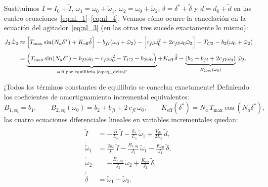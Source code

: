 \documentclass[11pt,a4paper,oneside]{book}
\begin{document}
Sustituimos $I = I_0 + \tilde I$, $\omega_1 = \omega_0 + \tilde\omega_1$,
$\omega_2 = \omega_0 + \tilde\omega_2$, $\delta = \delta^\ast + \tilde\delta$ y
$d = d_0 + \tilde d$ en las cuatro ecuaciones~\eqref{eq:nl_1}--\eqref{eq:nl_4}.
Veamos cómo ocurre la cancelación en la ecuación del agitador~\eqref{eq:nl_3}
(en las otras tres sucede exactamente lo mismo):
\begin{align*}
  J_2\,\dot{\tilde\omega}_2
  &\approx \Big[T_{\max}\sin(N_a\delta^\ast) + K_{\text{eff}}\tilde\delta\Big]
         - b_{fl}(\omega_0 + \tilde\omega_2)
         - \Big[c_{fl}\omega_0^2 + 2c_{fl}\omega_0\tilde\omega_2\Big]
         - T_{C2} - b_2(\omega_0 + \tilde\omega_2) \\[4pt]
  &= \underbrace{\Big(T_{\max}\sin(N_a\delta^\ast) - b_{fl}\omega_0 - c_{fl}\omega_0^2 - T_{C2} - b_2\omega_0\Big)}_{=\,0\text{ por equilibrio~\eqref{eq:eq_delta}!}}
   + K_{\text{eff}}\,\tilde\delta
   - \underbrace{(b_2 + b_{fl} + 2c_{fl}\omega_0)}_{B_{2,\text{eq}}(\omega_0)}\,\tilde\omega_2.
\end{align*}

¡Todos los términos constantes de equilibrio se cancelan exactamente! Definiendo
los coeficientes de amortiguamiento incremental equivalentes:
\begin{equation}
  B_{1,\text{eq}} = b_1,
  \qquad
  B_{2,\text{eq}}(\omega_0) = b_2 + b_{fl} + 2\,c_{fl}\,\omega_0,
  \qquad
  K_{\text{eff}}(\delta^\ast) = N_a\,T_{\max}\cos(N_a\delta^\ast),
  \label{eq:coefs_lin}
\end{equation}
las cuatro ecuaciones diferenciales lineales en variables incrementales quedan:
\begin{align}
  \dot{\tilde I}        &= -\frac{R}{L_s}\,\tilde I - \frac{k_e}{L_s}\,\tilde\omega_1 + \frac{V_{dc}}{2L_s}\,\tilde d, \label{eq:lin_1}\\
  \dot{\tilde\omega}_1  &= \frac{2k_e}{J_1}\,\tilde I - \frac{B_{1,\text{eq}}}{J_1}\,\tilde\omega_1 - \frac{K_{\text{eff}}}{J_1}\,\tilde\delta, \label{eq:lin_2}\\
  \dot{\tilde\omega}_2  &= -\frac{B_{2,\text{eq}}}{J_2}\,\tilde\omega_2 + \frac{K_{\text{eff}}}{J_2}\,\tilde\delta, \label{eq:lin_3}\\
  \dot{\tilde\delta}    &= \tilde\omega_1 - \tilde\omega_2. \label{eq:lin_4}
\end{align}
\end{document}

